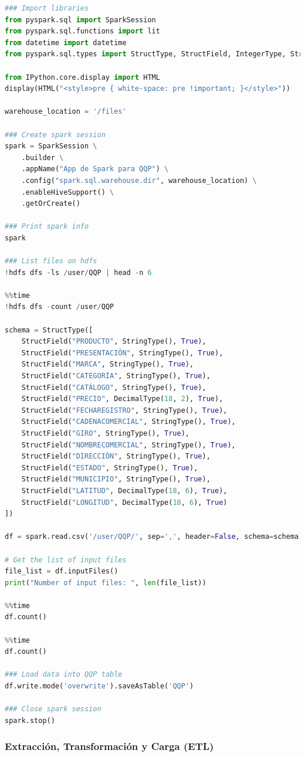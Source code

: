 \documentclass{article}
\begin{document}
\begin{lstlisting}[language=Python]
### Import libraries
from pyspark.sql import SparkSession
from pyspark.sql.functions import lit
from datetime import datetime
from pyspark.sql.types import StructType, StructField, IntegerType, StringType, DecimalType

from IPython.core.display import HTML
display(HTML("<style>pre { white-space: pre !important; }</style>"))

warehouse_location = '/files'

### Create spark session
spark = SparkSession \
    .builder \
    .appName("App de Spark para QQP") \
    .config("spark.sql.warehouse.dir", warehouse_location) \
    .enableHiveSupport() \
    .getOrCreate()

### Print spark info
spark

### List files on hdfs
!hdfs dfs -ls /user/QQP | head -n 6

%%time
!hdfs dfs -count /user/QQP

schema = StructType([
    StructField("PRODUCTO", StringType(), True),
    StructField("PRESENTACIÓN", StringType(), True),
    StructField("MARCA", StringType(), True),
    StructField("CATEGORÍA", StringType(), True),
    StructField("CATÁLOGO", StringType(), True),
    StructField("PRECIO", DecimalType(18, 2), True),
    StructField("FECHAREGISTRO", StringType(), True),
    StructField("CADENACOMERCIAL", StringType(), True),
    StructField("GIRO", StringType(), True),
    StructField("NOMBRECOMERCIAL", StringType(), True),
    StructField("DIRECCIÓN", StringType(), True),
    StructField("ESTADO", StringType(), True),
    StructField("MUNICIPIO", StringType(), True),
    StructField("LATITUD", DecimalType(18, 6), True),
    StructField("LONGITUD", DecimalType(18, 6), True)
])

df = spark.read.csv('/user/QQP/', sep=',', header=False, schema=schema)

# Get the list of input files
file_list = df.inputFiles()
print("Number of input files: ", len(file_list))

%%time
df.count()

%%time
df.count()

### Load data into QQP table
df.write.mode('overwrite').saveAsTable('QQP')

### Close spark session
spark.stop()
\end{lstlisting}

\subsubsection{Extracción, Transformación y Carga (ETL)}
\end{document}
